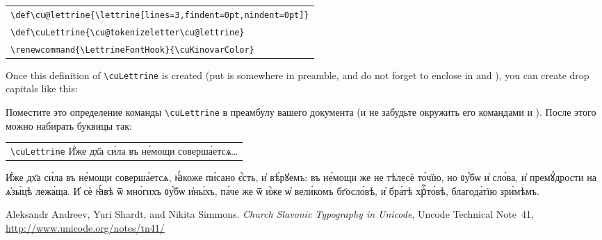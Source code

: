 \begin{center}
\begin{churchslavonic}
\begin{tabular}{l}
\verb+\def\cu@lettrine{\lettrine[lines=3,findent=0pt,nindent=0pt]}+\\
\verb+\def\cuLettrine{\cu@tokenizeletter\cu@lettrine}+\\
\verb+\renewcommand{\LettrineFontHook}{\cuKinovarColor}+\\
\end{tabular}
\end{churchslavonic}
\end{center}
%
\begin{EN}
Once this definition of \verb+\cuLettrine+ is created (put is somewhere in preamble, and do not forget to enclose in  and ),
you can create drop capitals like this:
\end{EN}
%
\begin{RU}
Поместите это определение команды \verb+\cuLettrine+ в преамбулу вашего документа (и не забудьте окружить его командами  и ).
После этого можно набирать буквицы так:
\end{RU}
%
\begin{center}
\begin{churchslavonic}
\begin{tabular}{l}
\verb+\cuLettrine+ И҆́же дх҃а си́ла въ не́мощи соверша́етсѧ\ldots\\
\end{tabular}
\end{churchslavonic}
\end{center}

\begin{churchslavonic}

\cuLettrine 
И҆́же дх҃а си́ла въ не́мощи соверша́етсѧ, ꙗ҆́коже пи́сано є҆́сть, и҆ вѣ́рꙋемъ: въ не́мощи же не тѣлесѐ то́чїю, но ᲂу҆́бѡ и҆ сло́ва, 
и҆ премꙋ́дрости на ѧ҆зы́цѣ лежа́ща. И҆ сѐ ꙗ҆́вѣ ѿ мно́гихъ ᲂу҆́бѡ и҆ны́хъ, па́че же ѿ и҆́же ѡ҆ вели́комъ бг҃осло́вѣ, и҆ бра́тѣ хрⷭ҇то́вѣ, 
благода́тїю зри́мѣмъ.

\end{churchslavonic}

\begin{thebibliography}{9}

  Aleksandr Andreev, Yuri Shardt, and Nikita Simmons.
  \emph{Church Slavonic Typography in Unicode},
  Uncode Technical Note~41,
  \url{http://www.unicode.org/notes/tn41/}

\end{thebibliography}


